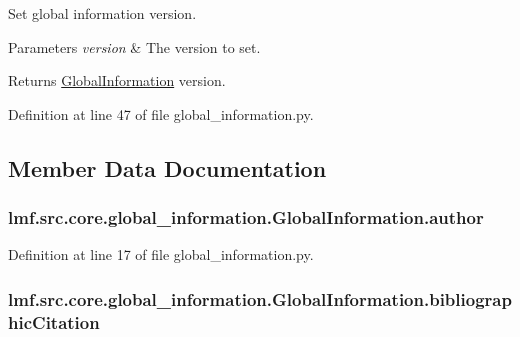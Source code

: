 Set global information version. 


\begin{DoxyParams}{Parameters}
{\em version} & The version to set. \\
\hline
\end{DoxyParams}
\begin{DoxyReturn}{Returns}
\hyperlink{classlmf_1_1src_1_1core_1_1global__information_1_1_global_information}{Global\+Information} version. 
\end{DoxyReturn}


Definition at line 47 of file global\+\_\+information.\+py.



\subsection{Member Data Documentation}
\hypertarget{classlmf_1_1src_1_1core_1_1global__information_1_1_global_information_a96ffe5559235b6b6c681b45a61d697af}{
\subsubsection[{author}]{\setlength{\rightskip}{0pt plus 5cm}lmf.\+src.\+core.\+global\+\_\+information.\+Global\+Information.\+author}}\label{classlmf_1_1src_1_1core_1_1global__information_1_1_global_information_a96ffe5559235b6b6c681b45a61d697af}


Definition at line 17 of file global\+\_\+information.\+py.

\hypertarget{classlmf_1_1src_1_1core_1_1global__information_1_1_global_information_a02d9de85d8225dc1411986b763df19ab}{
\subsubsection[{bibliographic\+Citation}]{\setlength{\rightskip}{0pt plus 5cm}lmf.\+src.\+core.\+global\+\_\+information.\+Global\+Information.\+bibliographic\+Citation}}\label{classlmf_1_1src_1_1core_1_1global__information_1_1_global_information_a02d9de85d8225dc1411986b763df19ab}


